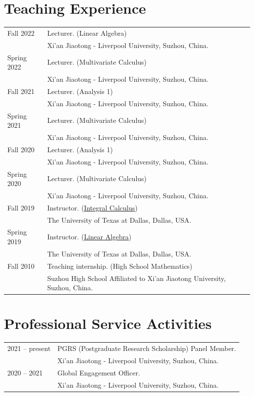 \documentclass[a4paper,12pt]{article}
\begin{document}
\section*{\Large{Teaching Experience}}
\begin{tabular}{@{}p{1.4in}p{4in}} 
Fall 2022 & Lecturer. (Linear Algebra) \\
             & Xi'an Jiaotong - Liverpool University, Suzhou, China.   \\
Spring 2022 & Lecturer. (Multivariate Calculus) \\
             & Xi'an Jiaotong - Liverpool University, Suzhou, China.   \\
Fall 2021 & Lecturer. (Analysis 1) \\
               & Xi'an Jiaotong - Liverpool University, Suzhou, China.   \\
Spring 2021 & Lecturer. (Multivariate Calculus) \\
             & Xi'an Jiaotong - Liverpool University, Suzhou, China.   \\
Fall 2020 & Lecturer. (Analysis 1) \\
               & Xi'an Jiaotong - Liverpool University, Suzhou, China.   \\
Spring 2020 & Lecturer. (Multivariate Calculus) \\
             & Xi'an Jiaotong - Liverpool University, Suzhou, China.   \\
Fall 2019 & Instructor. (\href{https://yzhang1616.github.io/calculus19fall/calculus.html}{Integral Calculus}) \\
             & The University of Texas at Dallas, Dallas, USA.   \\
Spring 2019           & Instructor. (\href{https://yzhang1616.github.io/algebra19spring/algebra.html}{Linear Algebra}) \\
                      & The University of Texas at Dallas, Dallas, USA. \\
Fall 2010             & Teaching internship. (High School Mathematics) \\
                      & Suzhou High School Affiliated to Xi'an Jiaotong University, Suzhou, China.                        
\end{tabular}

\section*{\Large{Professional Service Activities}}
\begin{tabular}{@{}p{1.4in}p{4in}} 
2021 -- present & PGRS (Postgraduate Research Scholarship) Panel Member. \\
                           & Xi'an Jiaotong - Liverpool University, Suzhou, China.  \\
2020 -- 2021 & Global Engagement Officer. \\
             & Xi'an Jiaotong - Liverpool University, Suzhou, China.                  
\end{tabular}
\end{document}
